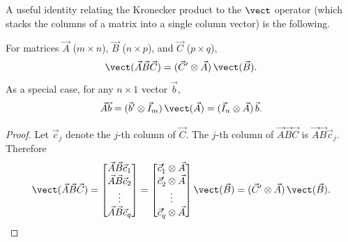 A useful identity relating the Kronecker product to the $\vect$
operator (which stacks the columns of a matrix into a single column
vector) is the following.

\begin{proposition}
\label{prop:vec-kronecker}
For matrices $\vec{A}$ ($m \times n$), $\vec{B}$ ($n \times p$), and
$\vec{C}$ ($p \times q$),
\begin{equation}
  \vect(\vec{A}\vec{B}\vec{C})
  = (\vec{C}' \otimes \vec{A})\,\vect(\vec{B}).
  \label{eq:A.23}
\end{equation}
As a special case, for any $n \times 1$ vector $\vec{b}$,
\begin{equation}
  \vec{A}\vec{b} = (\vec{b}' \otimes \vec{I}_m)
    \,\vect(\vec{A})
  = (\vec{I}_n \otimes \vec{A})\,\vec{b}.
  \label{eq:A.24}
\end{equation}
\end{proposition}

\begin{proof}
Let $\vec{c}_j$ denote the $j$-th column of $\vec{C}$.  The $j$-th
column of $\vec{A}\vec{B}\vec{C}$ is $\vec{A}\vec{B}\vec{c}_j$.
Therefore
\[
  \vect(\vec{A}\vec{B}\vec{C})
  = \begin{bmatrix}
    \vec{A}\vec{B}\vec{c}_1 \\
    \vec{A}\vec{B}\vec{c}_2 \\
    \vdots \\
    \vec{A}\vec{B}\vec{c}_q
  \end{bmatrix}
  = \begin{bmatrix}
    \vec{c}_1' \otimes \vec{A} \\
    \vec{c}_2' \otimes \vec{A} \\
    \vdots \\
    \vec{c}_q' \otimes \vec{A}
  \end{bmatrix}
  \vect(\vec{B})
  = (\vec{C}' \otimes \vec{A})\,\vect(\vec{B}). \qedhere
\]
\end{proof}
